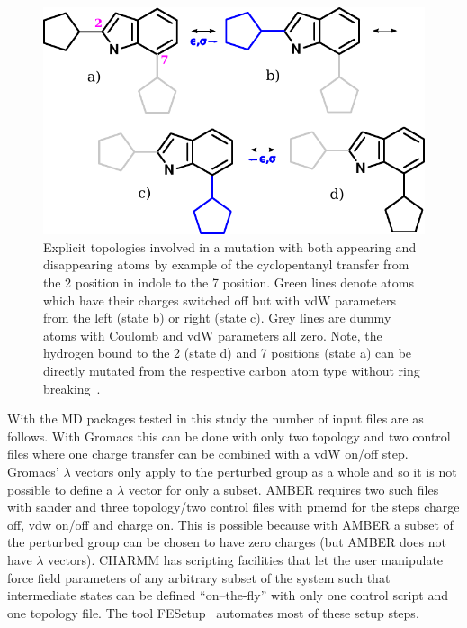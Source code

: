 \documentclass[journal=jctcce,manuscript=suppinfo]{achemso}
\begin{document}
\begin{figure}[ht]
\includegraphics[scale=1.0]{figures/dummies2.pdf}
\caption{Explicit topologies involved in a mutation with both
  appearing and disappearing atoms by example of the cyclopentanyl
  transfer from the 2 position in indole to the 7 position.  Green
  lines denote atoms which have their charges switched off but with
  vdW parameters from the left (state b) or right (state c). Grey
  lines are dummy atoms with Coulomb and vdW parameters all zero.
  Note, the hydrogen bound to the 2 (state d) and 7 positions (state
  a) can be directly mutated from the respective carbon atom type
  without ring breaking~\cite{doi:10.1021/acs.jcim.5b00057}.}
\label{fig:dummies2}
\end{figure}

With the MD packages tested in this study the number of input files
are as follows.  With Gromacs this can be done with only two topology
and two control files where one charge transfer can be combined with a
vdW on/off step.  Gromacs' $\lambda$ vectors only apply to the
perturbed group as a whole and so it is not possible to define a
$\lambda$ vector for only a subset.  AMBER requires two such files
with sander and three topology/two control files with pmemd for the
steps charge off, vdw on/off and charge on.  This is possible because
with AMBER a subset of the perturbed group can be chosen to have zero
charges (but AMBER does not have $\lambda$ vectors).  CHARMM has
scripting facilities that let the user manipulate force field
parameters of any arbitrary subset of the system such that
intermediate states can be defined ``on--the-fly'' with only one
control script and one topology file.  The tool
FESetup~\cite{loeffler_fesetup:_2015} automates most of these setup
steps.


\end{document}
